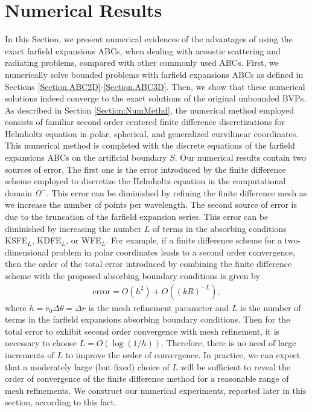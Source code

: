 \documentclass[final,3p,times,12pt]{elsarticle}
\begin{document}

\section{Numerical Results} \label{Section.Numerics2D}
In this Section,   {we present numerical evidences of the advantages of using the exact farfield expansions  ABCs, when dealing with acoustic scattering and radiating problems, compared with other commonly used ABCs.}
First, we numerically solve bounded problems with farfield expansions ABCs as defined in Sections \ref{Section.ABC2D}-\ref{Section.ABC3D}. Then, we show that these numerical solutions indeed converge to the exact solutions of the original unbounded BVPs. As described in Section \ref{Section:NumMethd}, the numerical method employed consists of familiar second order centered finite difference discretizations for Helmholtz equation in polar, spherical, and generalized curvilinear coordinates. This numerical method is completed with the discrete equations of the farfield expansions ABCs on the artificial boundary $S$.  
Our numerical results contain two sources of error. The first one is the error introduced by the finite difference scheme employed to discretize the Helmholtz equation in the computational domain $\Omega^{-}$. This error can be diminished by refining the finite difference mesh as we increase the number of points per wavelength. The second source of error is due to the truncation of the farfield expansion series. This error can be diminished by increasing the number $L$ of terms in the absorbing conditions KSFE$_L$, KDFE$_L$, or WFE$_L$. For example, if a finite difference scheme for a two-dimensional problem in polar coordinates leads to a second order convergence, then the order of the total error introduced by combining the finite difference scheme with the proposed absorbing boundary conditions is given by
\begin{align}
\text{error} = O \left( h^2 \right) + O\left( (kR)^{-L} \right), \label{TotalError}
\end{align}
where $h = r_{0} \Delta \theta = \Delta r$ is the mesh refinement parameter and $L$ is the number of terms in the farfield expansions absorbing boundary conditions. Then for the total error to exhibit second order convergence with mesh refinement, it is necessary to choose $L = O \left( \log( 1/h) \right)$. Therefore, there is no need of large increments of  $L$ to improve the order of convergence. In practice, we can expect that a moderately large (but fixed) choice of $L$ will be sufficient to reveal the order of convergence of the finite difference method for a reasonable range of mesh refinements. We construct our numerical experiments, reported later in this section, according to this fact.
\end{document}
